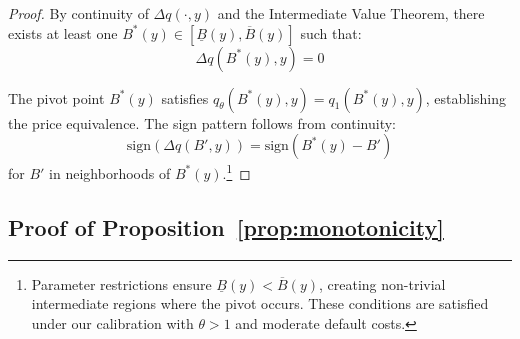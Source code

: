 \documentclass[12pt]{article}
\theoremstyle{plain}
\begin{document}
\begin{proof}
	By continuity of $\Delta q(\cdot, y)$ and the Intermediate Value Theorem, there
	exists at least one $B^*(y) \in [\underline{B}(y), \overline{B}(y)]$ such that:
	\begin{equation}
		\Delta q(B^*(y), y) = 0 \label{eq:pivot_point}
	\end{equation}

	The pivot point $B^*(y)$ satisfies $q_\theta(B^*(y), y) = q_1(B^*(y), y)$,
	establishing the price equivalence. The sign pattern follows from continuity:
	\begin{equation}
		\mathrm{sign}(\Delta q(B', y)) = \mathrm{sign}(B^*(y) - B') \label{eq:pivot_pattern}
	\end{equation}
	for $B'$ in neighborhoods of $B^*(y)$.\footnote{Parameter restrictions ensure $\underline{B}(y) < \overline{B}(y)$, creating non-trivial intermediate regions where the pivot occurs. These conditions are satisfied under our calibration with $\theta > 1$ and moderate default costs.}
\end{proof}

\subsection{Proof of Proposition~\ref{prop:monotonicity}}\label{app:proof_monotonicity}
\end{document}
